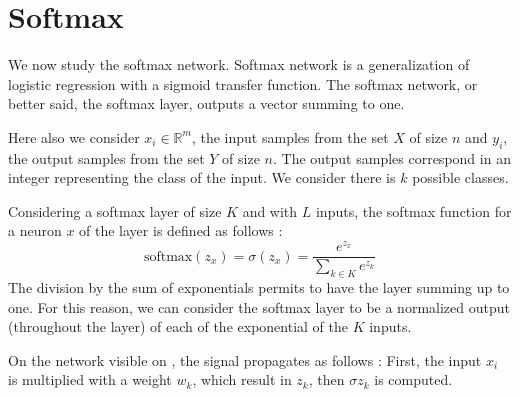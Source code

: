 
\section{Softmax} 
\label{sec:softmax}

	We now study the softmax network. Softmax network is a generalization of logistic regression with a sigmoid transfer function. 
	The softmax network, or better said, the softmax layer, outputs a vector summing to one. 

	Here also we consider $x_i \in \mathbb{R}^m$, the input samples from the set $X$ of size $n$ and $y_i$, the output samples from the set $Y$ of size $n$. The output samples correspond in an integer representing the class of the input. We consider there is $k$ possible classes.

	Considering a softmax layer of size $K$ and with $L$ inputs, the softmax function for a neuron $x$ of the layer is defined as follows :
	$$ \text{softmax}(z_{x}) = \sigma(z_{x}) = \frac{e^{z_{x}}}{\sum_{k\in K} e^{z_k}} $$
	The division by the sum of exponentials permits to have the layer summing up to one. For this reason, we can consider the softmax layer to be a normalized output (throughout the layer) of each of the exponential of the $K$ inputs. 

	On the network visible on , the signal propagates as follows : First, the input $x_i$ is multiplied with a weight $w_k$, which result in $z_k$, then $\sigma{z_k}$ is computed. 

